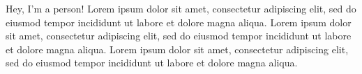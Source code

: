 Hey, I'm a person!
Lorem ipsum dolor sit amet, consectetur adipiscing elit, sed do eiusmod tempor incididunt ut labore et dolore magna aliqua. 
Lorem ipsum dolor sit amet, consectetur adipiscing elit, sed do eiusmod tempor incididunt ut labore et dolore magna aliqua. 
Lorem ipsum dolor sit amet, consectetur adipiscing elit, sed do eiusmod tempor incididunt ut labore et dolore magna aliqua. 

